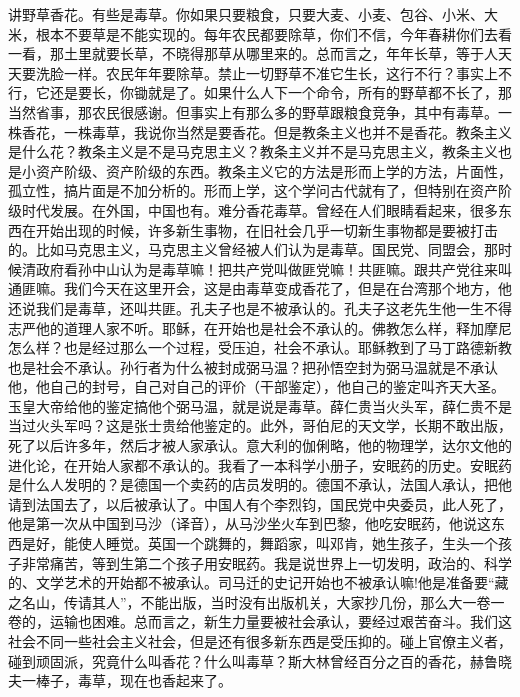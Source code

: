 讲野草香花。有些是毒草。你如果只要粮食，只要大麦、小麦、包谷、小米、大米，根本不要草是不能实现的。每年农民都要除草，你们不信，今年春耕你们去看一看，那土里就要长草，不晓得那草从哪里来的。总而言之，年年长草，等于人天天要洗脸一样。农民年年要除草。禁止一切野草不准它生长，这行不行？事实上不行，它还是要长，你锄就是了。如果什么人下一个命令，所有的野草都不长了，那当然省事，那农民很感谢。但事实上有那么多的野草跟粮食竞争，其中有毒草。一株香花，一株毒草，我说你当然是要香花。但是教条主义也并不是香花。教条主义是什么花？教条主义是不是马克思主义？教条主义并不是马克思主义，教条主义也是小资产阶级、资产阶级的东西。教条主义它的方法是形而上学的方法，片面性，孤立性，搞片面是不加分析的。形而上学，这个学问古代就有了，但特别在资产阶级时代发展。在外国，中国也有。难分香花毒草。曾经在人们眼睛看起来，很多东西在开始出现的时候，许多新生事物，在旧社会几乎一切新生事物都是要被打击的。比如马克思主义，马克思主义曾经被人们认为是毒草。国民党、同盟会，那时候清政府看孙中山认为是毒草嘛！把共产党叫做匪党嘛！共匪嘛。跟共产党往来叫通匪嘛。我们今天在这里开会，这是由毒草变成香花了，但是在台湾那个地方，他还说我们是毒草，还叫共匪。孔夫子也是不被承认的。孔夫子这老先生他一生不得志严他的道理人家不听。耶稣，在开始也是社会不承认的。佛教怎么样，释加摩尼怎么样？也是经过那么一个过程，受压迫，社会不承认。耶稣教到了马丁路德新教也是社会不承认。孙行者为什么被封成弼马温？把孙悟空封为弼马温就是不承认他，他自己的封号，自己对自己的评价（干部鉴定），他自己的鉴定叫齐天大圣。玉皇大帝给他的鉴定搞他个弼马温，就是说是毒草。薛仁贵当火头军，薛仁贵不是当过火头军吗？这是张士贵给他鉴定的。此外，哥伯尼的天文学，长期不敢出版，死了以后许多年，然后才被人家承认。意大利的伽俐略，他的物理学，达尔文他的进化论，在开始人家都不承认的。我看了一本科学小册子，安眠药的历史。安眠药是什么人发明的？是德国一个卖药的店员发明的。德国不承认，法国人承认，把他请到法国去了，以后被承认了。中国人有个李烈钧，国民党中央委员，此人死了，他是第一次从中国到马沙（译音），从马沙坐火车到巴黎，他吃安眠药，他说这东西是好，能使人睡觉。英国一个跳舞的，舞蹈家，叫邓肯，她生孩子，生头一个孩子非常痛苦，等到生第二个孩子用安眠药。我是说世界上一切发明，政治的、科学的、文学艺术的开始都不被承认。司马迁的史记开始也不被承认嘛!他是准备要“藏之名山，传请其人”，不能出版，当时没有出版机关，大家抄几份，那么大一卷一卷的，运输也困难。总而言之，新生力量要被社会承认，要经过艰苦奋斗。我们这社会不同一些社会主义社会，但是还有很多新东西是受压抑的。碰上官僚主义者，碰到顽固派，究竟什么叫香花？什么叫毒草？斯大林曾经百分之百的香花，赫鲁晓夫一棒子，毒草，现在也香起来了。

